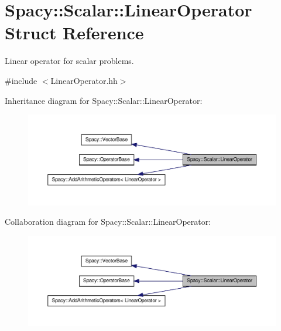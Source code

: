 \hypertarget{structSpacy_1_1Scalar_1_1LinearOperator}{\section{\-Spacy\-:\-:\-Scalar\-:\-:\-Linear\-Operator \-Struct \-Reference}
\label{structSpacy_1_1Scalar_1_1LinearOperator}
}


\-Linear operator for scalar problems.  




{\ttfamily \#include $<$\-Linear\-Operator.\-hh$>$}



\-Inheritance diagram for \-Spacy\-:\-:\-Scalar\-:\-:\-Linear\-Operator\-:
\nopagebreak
\begin{figure}[H]
\begin{center}
\leavevmode
\includegraphics[width=350pt]{structSpacy_1_1Scalar_1_1LinearOperator__inherit__graph}
\end{center}
\end{figure}


\-Collaboration diagram for \-Spacy\-:\-:\-Scalar\-:\-:\-Linear\-Operator\-:
\nopagebreak
\begin{figure}[H]
\begin{center}
\leavevmode
\includegraphics[width=350pt]{structSpacy_1_1Scalar_1_1LinearOperator__coll__graph}
\end{center}
\end{figure}
